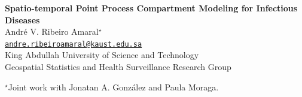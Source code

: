 \documentclass[12pt, aspectratio = 169]{beamer} %
\author{André Victor Ribeiro Amaral \\ \href{mailto:andre.ribeiroamaral@kaust.edu.sa}{andre.ribeiroamaral@kaust.edu.sa}}
\begin{document}
	\AtBeginSection{}
	
	
	{

		\begin{frame}[t]
			\centering
			\vspace{42pt}
			\textbf{{\large {} Spatio-temporal Point Process Compartment Modeling for Infectious Diseases}} \\
			\vspace{18pt}
			{\normalsize André V.\hspace{-1pt} Ribeiro\hspace{-1pt} Amaral\hspace{1pt}${}^{\star}$}\\
			{\scriptsize\texttt{\href{mailto:andre.ribeiroamaral@kaust.edu.sa}{andre.ribeiroamaral@kaust.edu.sa}}} \\
			\vspace{18pt}
			{\small King Abdullah University of Science and Technology}\\
			{\small Geospatial Statistics and Health Surveillance Research Group} \\
			\vspace{10pt}
			\begin{flushleft} {${}^{\star}$\hspace{1pt}\scriptsize Joint work with Jonatan A. González and Paula Moraga.}\end{flushleft}
		\end{frame}
	}
	
	
\end{document}
